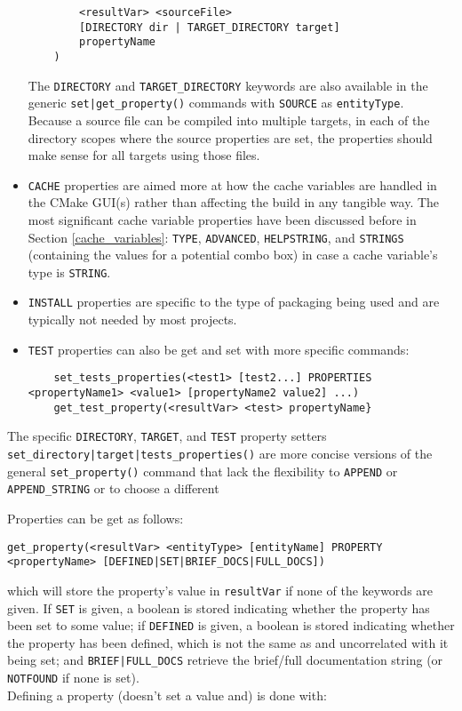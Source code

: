 \documentclass[8pt, table, xcdraw]{article}%
\begin{document}
\begin{itemize}
\begin{lstlisting}
        <resultVar> <sourceFile>
        [DIRECTORY dir | TARGET_DIRECTORY target]
        propertyName
    )
    \end{lstlisting}
    The \lstinline{DIRECTORY} and \lstinline{TARGET_DIRECTORY} keywords are also available in the generic \lstinline{set|get_property()} commands with \lstinline{SOURCE} as \lstinline{entityType}.\\
    Because a source file can be compiled into multiple targets, in each of the directory scopes where the source properties are set, the properties should make sense for all targets using those files.
    \item \lstinline{CACHE} properties are aimed more at how the cache variables are handled in the CMake GUI(s) rather than affecting the build in any tangible way. The most significant cache variable properties have been discussed before in Section \ref{cache_variables}: \lstinline{TYPE}, \lstinline{ADVANCED}, \lstinline{HELPSTRING}, and \lstinline{STRINGS} (containing the values for a potential combo box) in case a cache variable's type is \lstinline{STRING}.
    \item \lstinline{INSTALL} properties are specific to the type of packaging being used and are typically not needed by most projects.
    \item \lstinline{TEST} properties can also be get and set with more specific commands:
    
    \begin{lstlisting}
    set_tests_properties(<test1> [test2...] PROPERTIES <propertyName1> <value1> [propertyName2 value2] ...)
    get_test_property(<resultVar> <test> propertyName}
    \end{lstlisting}
\end{itemize}

The specific \lstinline{DIRECTORY}, \lstinline{TARGET}, and \lstinline{TEST} property setters \lstinline{set_directory|target|tests_properties()} are more concise versions of the general \lstinline{set_property()} command that lack the flexibility to \lstinline{APPEND} or \lstinline{APPEND_STRING} or to choose a different

Properties can be get as follows:

\begin{lstlisting}
get_property(<resultVar> <entityType> [entityName] PROPERTY <propertyName> [DEFINED|SET|BRIEF_DOCS|FULL_DOCS])
\end{lstlisting}

which will store the property's value in \lstinline{resultVar} if none of the keywords are given. If \lstinline{SET} is given, a boolean is stored indicating whether the property has been set to some value; if \lstinline{DEFINED} is given, a boolean is stored indicating whether the property has been defined, which is not the same as and uncorrelated with it being set; and \lstinline{BRIEF|FULL_DOCS} retrieve the brief/full documentation string (or \lstinline{NOTFOUND} if none is set).\\
Defining a property (doesn't set a value and) is done with:
\end{document}
